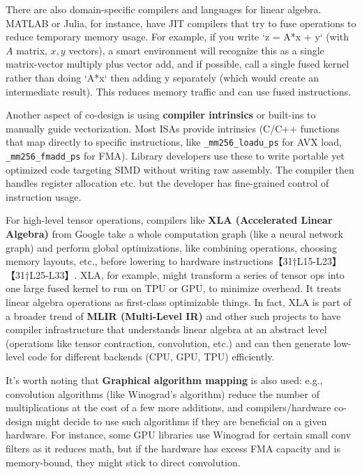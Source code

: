 There are also domain-specific compilers and languages for linear algebra. MATLAB or Julia, for instance, have JIT compilers that try to fuse operations to reduce temporary memory usage. For example, if you write `z = A*x + y` (with $A$ matrix, $x,y$ vectors), a smart environment will recognize this as a single matrix-vector multiply plus vector add, and if possible, call a single fused kernel rather than doing `A*x` then adding y separately (which would create an intermediate result). This reduces memory traffic and can use fused instructions.

Another aspect of co-design is using \textbf{compiler intrinsics} or built-ins to manually guide vectorization. Most ISAs provide intrinsics (C/C++ functions that map directly to specific instructions, like \texttt{\_mm256\_loadu\_ps} for AVX load, \texttt{\_mm256\_fmadd\_ps} for FMA). Library developers use these to write portable yet optimized code targeting SIMD without writing raw assembly. The compiler then handles register allocation etc. but the developer has fine-grained control of instruction usage.

For high-level tensor operations, compilers like \textbf{XLA (Accelerated Linear Algebra)} from Google take a whole computation graph (like a neural network graph) and perform global optimizations, like combining operations, choosing memory layouts, etc., before lowering to hardware instructions【31†L15-L23】【31†L25-L33】. XLA, for example, might transform a series of tensor ops into one large fused kernel to run on TPU or GPU, to minimize overhead. It treats linear algebra operations as first-class optimizable things. In fact, XLA is part of a broader trend of \textbf{MLIR (Multi-Level IR)} and other such projects to have compiler infrastructure that understands linear algebra at an abstract level (operations like tensor contraction, convolution, etc.) and can then generate low-level code for different backends (CPU, GPU, TPU) efficiently.

It’s worth noting that \textbf{Graphical algorithm mapping} is also used: e.g., convolution algorithms (like Winograd’s algorithm) reduce the number of multiplications at the cost of a few more additions, and compilers/hardware co-design might decide to use such algorithms if they are beneficial on a given hardware. For instance, some GPU libraries use Winograd for certain small conv filters as it reduces math, but if the hardware has excess FMA capacity and is memory-bound, they might stick to direct convolution.


